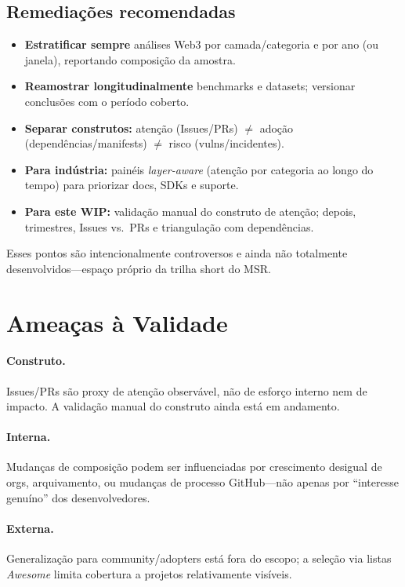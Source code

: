 \documentclass[10pt,conference]{IEEEtran}
\begin{document}
\subsection{Remediações recomendadas}
\begin{itemize}
\item \textbf{Estratificar sempre} análises Web3 por camada/categoria e por ano (ou janela), reportando composição da amostra.
\item \textbf{Reamostrar longitudinalmente} benchmarks e datasets; versionar conclusões com o período coberto.
\item \textbf{Separar construtos:} atenção (Issues/PRs) $\neq$ adoção (dependências/manifests) $\neq$ risco (vulns/incidentes).
\item \textbf{Para indústria:} painéis \emph{layer-aware} (atenção por categoria ao longo do tempo) para priorizar docs, SDKs e suporte.
\item \textbf{Para este WIP:} validação manual do construto de atenção; depois, trimestres, Issues vs.\ PRs e triangulação com dependências.
\end{itemize}

Esses pontos são intencionalmente controversos e ainda não totalmente desenvolvidos---espaço próprio da trilha short do MSR.

\section{Ameaças à Validade}

\paragraph{Construto.}
Issues/PRs são proxy de atenção observável, não de esforço interno nem de impacto. A validação manual do construto ainda está em andamento.

\paragraph{Interna.}
Mudanças de composição podem ser influenciadas por crescimento desigual de orgs, arquivamento, ou mudanças de processo GitHub---não apenas por ``interesse genuíno'' dos desenvolvedores.

\paragraph{Externa.}
Generalização para community/adopters está fora do escopo; a seleção via listas \emph{Awesome} limita cobertura a projetos relativamente visíveis.
\end{document}

